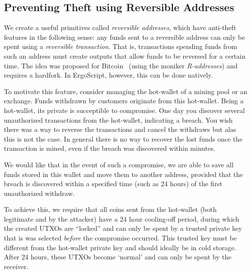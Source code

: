 \documentclass[11pt]{article}
\newcommand{\langname}{ErgoScript\xspace}
\begin{document}
\subsection{Preventing Theft using Reversible Addresses}

We create a useful primitives called {\em reversible addresses}, which have anti-theft features in the following sense:
any funds sent to a reversible address can only be spent using a {\em reversible transaction}. That is, transactions spending funds from such an address must create outputs that allow funds to be reversed for a certain time. The idea was proposed for Bitcoin~\cite{raddress} (using the moniker {\em R-addresses}) and requires a hardfork. In \langname, however, this can be done natively.

To motivate this feature, consider managing the hot-wallet of a mining pool or an exchange. Funds withdrawn by customers originate from this hot-wallet. Being a hot-wallet, its private is succeptible to compromise. One day you discover several unauthorized transactions from the hot-wallet, indicating a breach. You wish there was a way to reverse the transactions and cancel the withdraws but alas this is not the case. In general there is no way to recover the lost funds once the transaction is mined, even if the breach was discovered within minutes. 

We would like that in the event of such a compromise, we are able to save all funds stored in this wallet and move them to another address, provided that the breach is discovered within a specified time (such as 24 hours) of the first unauthorized withdraw. 

To achieve this, we require that all coins sent from the hot-wallet (both legitimate and by the attacker)
have a 24 hour cooling-off period, during which the created UTXOs are ``locked'' and can only be spent by a trusted private key that is was selected {\em before} the compromise occurred. This trusted key must be different from the hot-wallet private key and should ideally be in cold storage. 
After 24 hours, these UTXOs become `normal' and can only be spent by the receiver.
\end{document}
